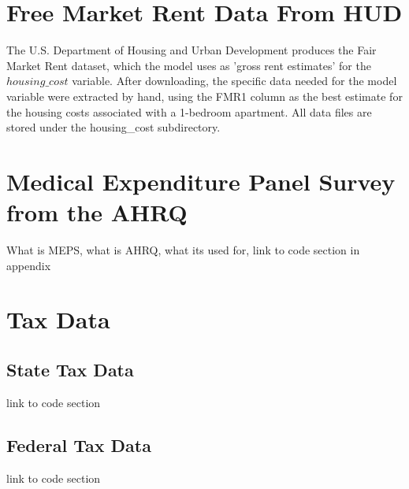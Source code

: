 \section{Free Market Rent Data From HUD}

The U.S. Department of Housing and Urban Development produces the Fair Market Rent dataset, which the model uses as 'gross rent estimates' for the $housing\_cost$ variable. \cite{fmr} After downloading, the specific data needed for the model variable were extracted by hand, using the FMR1 column as the best estimate for the housing costs associated with a 1-bedroom apartment. All data files are stored under the housing\_cost subdirectory. 


\section{Medical Expenditure Panel Survey from the AHRQ}

What is MEPS, what is AHRQ, what its used for, link to code section in appendix

\section{Tax Data}

\subsection{State Tax Data}

link to code section

\subsection{Federal Tax Data}

link to code section
